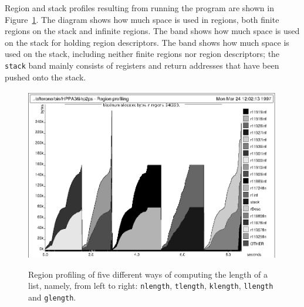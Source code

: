 \documentclass[12pt]{book}
\begin{document}
Region and stack profiles resulting from running the program
are shown in Figure~\ref{length.region.fig}.
The diagram shows how much space is used in
regions, both finite regions on the stack and infinite regions. 
The  band shows how much space is used on the stack for
holding region descriptors. The 
 band shows how much space is used on the stack, 
including neither finite regions nor region descriptors; the {\tt stack}
band mainly consists of registers and return addresses 
that have been pushed onto the stack. 
\begin{figure}
\begin{center}
\vbox{
{\includegraphics{length.region.ps}}
}
\end{center}
\caption{Region profiling of five different
ways of computing the length of a list, namely, from left to right:
{\tt nlength}, {\tt tlength}, {\tt klength}, {\tt llength}
and {\tt glength}.}
\label{length.region.fig}
\end{figure}
%
%
%

\end{document}
